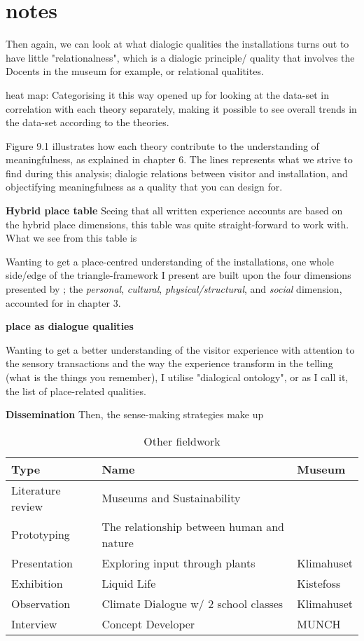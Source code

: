 \section{notes}

\par Then again, we can look at what dialogic qualities the installations turns out to have little "relationalness", which is a dialogic principle/ quality that involves the Docents in the museum for example, or relational qualitites.


heat map: Categorising it this way opened up for looking at the data-set in correlation with each theory separately, making it possible to see overall trends in the data-set according to the theories. 

Figure 9.1 illustrates how each theory contribute to the understanding of meaningfulness, as explained in chapter 6. The lines represents what we strive to find during this analysis; dialogic relations between visitor and installation, and objectifying meaningfulness as a quality that you can design for.



\textbf{Hybrid place table}
Seeing that all written experience accounts are based on the hybrid place dimensions, this table was quite straight-forward to work with. What we see from this table is 

Wanting to get a place-centred understanding of the installations, one whole side/edge of the triangle-framework I present are built upon the four dimensions presented by \autocite{hybridplace_ciolfi}; the \emph{personal}, \emph{cultural}, \emph{physical/structural}, and \emph{social} dimension, accounted for in chapter 3.


\textbf{place as dialogue qualities}

Wanting to get a better understanding of the visitor experience with attention to the sensory transactions and the way the experience transform in the telling (what is the things you remember), I utilise \autocite{spaceplace_ciolfi} "dialogical ontology", or as I call it, the list of place-related qualities. 

\textbf{Dissemination}
Then, the sense-making strategies make up



\begin{table}[h]
\centering
\begin{tabular}{l | l| l}
\textbf{Type} & \textbf{Name} & \textbf{Museum}\\
\hline
Literature review & Museums and Sustainability & \\
Prototyping & The relationship between human and nature \\
Presentation & Exploring input through plants & Klimahuset\\
Exhibition & Liquid Life & Kistefoss \\
Observation & Climate Dialogue w/ 2 school classes & Klimahuset\\
Interview & Concept Developer & MUNCH\\
\end{tabular}
\caption{Other fieldwork}
\label{tab:abc}
\end{table}


